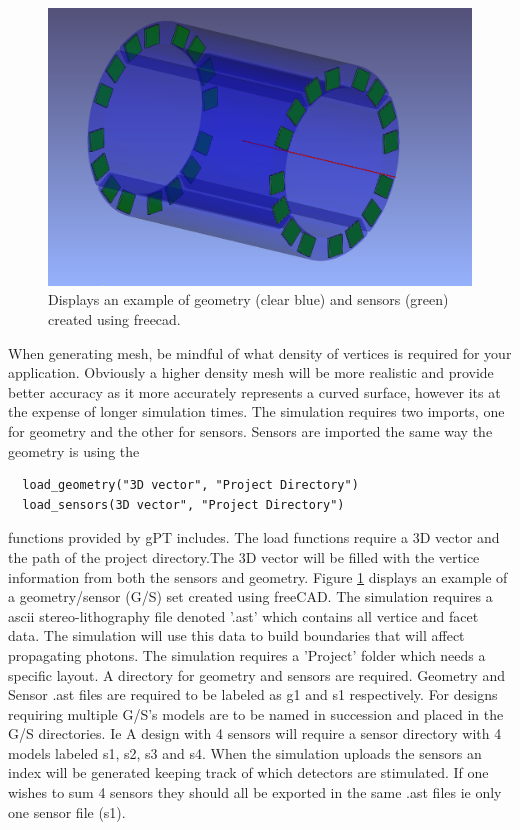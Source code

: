 \documentclass[paper=a4, fontsize=11pt]{scrartcl}
\numberwithin{equation}{section}		%
\numberwithin{figure}{section}			%
\numberwithin{table}{section}				%
\begin{document}
\begin{figure}[h!]
\centering
\includegraphics[width=0.70\linewidth]{fcad}
\caption{Displays an example of geometry (clear blue) and sensors (green) created using freecad.}
\label{geosens}
\end{figure}

 When generating mesh, be mindful of what density of vertices is required for your application. Obviously a higher density mesh will be more realistic and provide better accuracy as it more accurately represents a curved surface, however its at the expense of longer simulation times. The simulation requires two imports, one for geometry and the other for sensors. Sensors are imported the same way the geometry is using the
 \begin{verbatim}
  load_geometry("3D vector", "Project Directory")
  load_sensors(3D vector", "Project Directory") 
 \end{verbatim} 

 functions provided by gPT includes. The load functions require a 3D vector and the path of the project directory.The 3D vector will be filled with the vertice information from both the sensors and geometry. Figure \ref{geosens} displays an example of a geometry/sensor (G/S) set created using freeCAD. The simulation requires a ascii stereo-lithography file denoted '.ast' which contains all vertice and facet data. The simulation will use this data to build boundaries that will affect propagating photons.  The simulation requires a 'Project' folder which needs a specific layout. A directory for geometry and sensors are required. Geometry and Sensor .ast files are required to be labeled as g1 and s1 respectively. For designs requiring multiple G/S's models are to be named in succession and placed in the G/S directories. Ie A design with 4 sensors will require a sensor directory with 4 models labeled s1, s2, s3 and s4. When the simulation uploads the sensors an index will be generated keeping track of which detectors are stimulated. If one wishes to sum 4 sensors they should all be exported in the same .ast files ie only one sensor file (s1).
 
\end{document}
